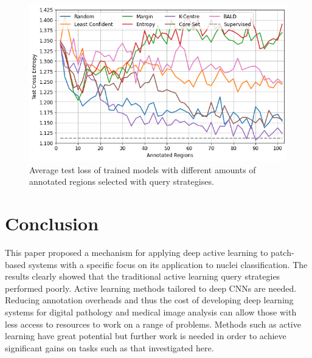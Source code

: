 \begin{figure}
	\centering
	\includegraphics[width=\textwidth]{images/active_learning_loss.png}
	\caption{Average test loss of trained models with different amounts of annotated regions selected with query strategises.}
	\label{fig:active_learning_loss}
\end{figure}


\section{Conclusion}
This paper proposed a mechanism for applying deep active learning to patch-based systems with a specific focus on its application to nuclei classification. The results clearly showed that the traditional active learning query strategies performed poorly. Active learning methods tailored to deep CNNs are needed. Reducing annotation overheads and thus the cost of developing deep learning systems for digital pathology and medical image analysis can allow those with less access to resources to work on a range of problems. Methods such as active learning have great potential but further work is needed in order to achieve significant gains on tasks such as that investigated here. 
